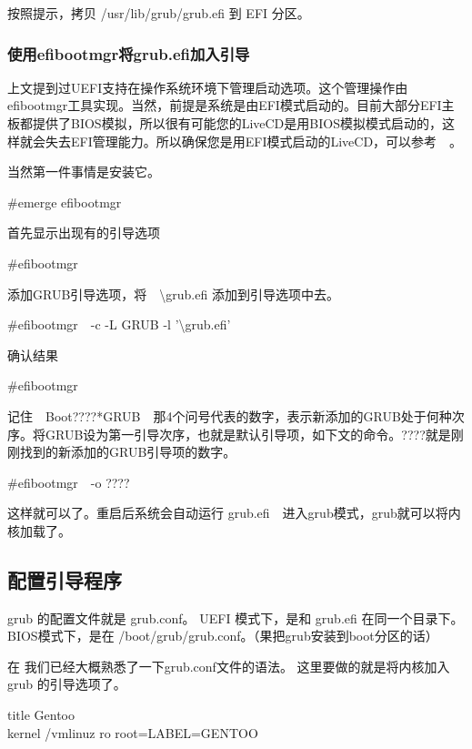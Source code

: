 按照提示，拷贝 /usr/lib/grub/grub.efi 到 EFI 分区。

\subsubsection*{使用efibootmgr将grub.efi加入引导}

上文提到过UEFI支持在操作系统环境下管理启动选项。这个管理操作由efibootmgr工具实现。当然，前提是系统是由EFI模式启动的。目前大部分EFI主板都提供了BIOS模拟，所以很有可能您的LiveCD是用BIOS模拟模式启动的，这样就会失去EFI管理能力。所以确保您是用EFI模式启动的LiveCD，可以参考　。

当然第一件事情是安装它。
\begin{code}
\#emerge efibootmgr
\end{code}

首先显示出现有的引导选项
\begin{code}
\#efibootmgr
\end{code}

添加GRUB引导选项，将　\textbackslash{}grub.efi 添加到引导选项中去。
\begin{code}
\#efibootmgr　-c -L GRUB -l '\textbackslash{}grub.efi'
\end{code}

确认结果
\begin{code}
\#efibootmgr
\end{code}

记住　Boot????*GRUB　那4个问号代表的数字，表示新添加的GRUB处于何种次序。将GRUB设为第一引导次序，也就是默认引导项，如下文的命令。????就是刚刚找到的新添加的GRUB引导项的数字。

\begin{code}
\#efibootmgr　-o ????
\end{code}

这样就可以了。重启后系统会自动运行 grub.efi　进入grub模式，grub就可以将内核加载了。

\subsection{配置引导程序}\label{sec:bootloader}

grub 的配置文件就是 grub.conf。 UEFI 模式下，是和 grub.efi 在同一个目录下。 BIOS模式下，是在 /boot/grub/grub.conf。（果把grub安装到boot分区的话）

在  我们已经大概熟悉了一下grub.conf文件的语法。
这里要做的就是将内核加入 grub 的引导选项了。

\begin{code}
title Gentoo\\
kernel /vmlinuz ro root=LABEL=GENTOO\\
\end{code}

